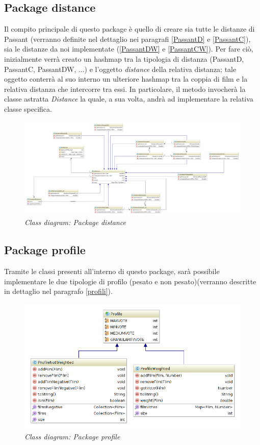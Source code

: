\subsection{Package distance}
Il compito principale di questo package è quello di creare sia tutte le distanze di Passant (verranno definite nel dettaglio nei paragrafi \ref{PassantD} e \ref{PassantC}), sia le distanze da noi implementate (\ref{PassantDW} e \ref{PassantCW}). Per fare ciò, inizialmente verrà creato un hashmap tra la tipologia di distanza (PassantD, PassantC, PassantDW, ...) e l'oggetto \emph{distance} della relativa distanza; tale oggetto conterrà al suo interno un ulteriore hashmap tra la coppia di film e la relativa distanza che intercorre tra essi. In particolare, il metodo invocherà la classe astratta \emph{Distance} la quale, a sua volta, andrà ad implementare la relativa classe specifica.

\begin{figure}[H]
	\advance\leftskip-3cm
	\includegraphics[width=1.45\textwidth]{./images/Diagrams/distance.png}
	\caption{\emph{Class diagram: Package distance}}
\end{figure}

\subsection{Package profile}
Tramite le classi presenti all'interno di questo package, sarà possibile implementare le due tipologie di profilo (pesato e non pesato)(verranno descritte in dettaglio nel paragrafo \ref{profili}).
\begin{figure}[H]
	\includegraphics[width=\textwidth]{./images/Diagrams/profile.png}
	\caption{\emph{Class diagram: Package profile}}
\end{figure}

